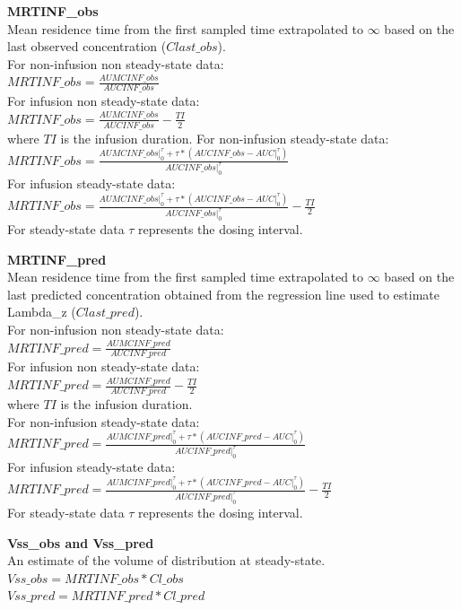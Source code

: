 \documentclass[
  12pt,
]{krantz}
\begin{document}
\textbf{MRTINF\_obs}\\
Mean residence time from the first sampled time extrapolated to \({\infty}\) based on the last observed concentration (\({Clast\_obs}\)).\\
For non-infusion non steady-state data:\\
\(MRTINF\_obs = \frac{AUMCINF\_obs}{AUCINF\_obs}\)\\
For infusion non steady-state data:\\
\(MRTINF\_obs = \frac{AUMCINF\_obs}{AUCINF\_obs}-\frac{TI}{2}\)\\
where \({TI}\) is the infusion duration. For non-infusion steady-state data:\\
\(MRTINF\_obs = \frac{AUMCINF\_obs|_{0}^{\tau}+\tau*(AUCINF\_obs-AUC|_{0}^{\tau})}{AUCINF\_obs|_{0}^{\tau}}\)\\
For infusion steady-state data:\\
\(MRTINF\_obs = \frac{AUMCINF\_obs|_{0}^{\tau}+\tau*(AUCINF\_obs-AUC|_{0}^{\tau})}{AUCINF\_obs|_{0}^{\tau}}-\frac{TI}{2}\)\\
For steady-state data \({\tau}\) represents the dosing interval.

\textbf{MRTINF\_pred}\\
Mean residence time from the first sampled time extrapolated to \({\infty}\) based on the last predicted concentration obtained from the regression line used to estimate Lambda\_z (\({Clast\_pred}\)).\\
For non-infusion non steady-state data:\\
\(MRTINF\_pred = \frac{AUMCINF\_pred}{AUCINF\_pred}\)\\
For infusion non steady-state data:\\
\(MRTINF\_pred = \frac{AUMCINF\_pred}{AUCINF\_pred}-\frac{TI}{2}\)\\
where \({TI}\) is the infusion duration.\\
For non-infusion steady-state data:\\
\(MRTINF\_pred = \frac{AUMCINF\_pred|_{0}^{\tau}+\tau*(AUCINF\_pred-AUC|_{0}^{\tau})}{AUCINF\_pred|_{0}^{\tau}}\)\\
For infusion steady-state data:\\
\(MRTINF\_pred = \frac{AUMCINF\_pred|_{0}^{\tau}+\tau*(AUCINF\_pred-AUC|_{0}^{\tau})}{AUCINF\_pred|_{0}^{\tau}}-\frac{TI}{2}\)\\
For steady-state data \({\tau}\) represents the dosing interval.

\textbf{Vss\_obs and Vss\_pred}\\
An estimate of the volume of distribution at steady-state.\\
\(Vss\_obs = MRTINF\_obs*Cl\_obs\)\\
\(Vss\_pred = MRTINF\_pred*Cl\_pred\)
\end{document}

